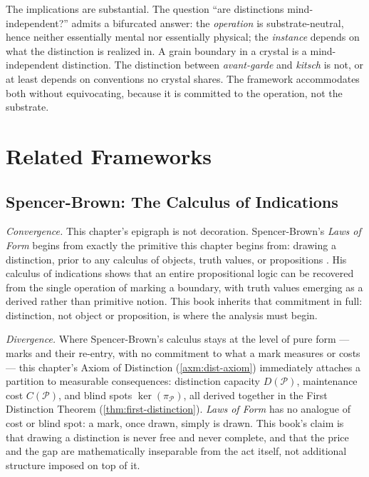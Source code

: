 \documentclass[12pt,twoside,openright]{book}
\newcommand{\partition}{\mathcal{P}}
\begin{document}
The implications are substantial. The question ``are
distinctions mind-independent?'' admits a bifurcated answer:
the \emph{operation} is substrate-neutral, hence neither
essentially mental nor essentially physical; the
\emph{instance} depends on what the distinction is realized
in. A grain boundary in a crystal is a mind-independent
distinction. The distinction between \emph{avant-garde} and
\emph{kitsch} is not, or at least depends on conventions no
crystal shares. The framework accommodates both without
equivocating, because it is committed to the operation, not
the substrate.

\section{Related Frameworks}
\label{sec:ch1-related-frameworks}

\subsection*{Spencer-Brown: The Calculus of Indications}

\emph{Convergence.} This chapter's epigraph is not decoration.
Spencer-Brown's \emph{Laws of Form} begins from exactly the
primitive this chapter begins from: drawing a distinction,
prior to any calculus of objects, truth values, or
propositions \parencite{spencer-brown1969}. His calculus of
indications shows that an entire propositional logic can be
recovered from the single operation of marking a boundary,
with truth values emerging as a derived rather than primitive
notion. This book inherits that commitment in full: distinction,
not object or proposition, is where the analysis must begin.

\emph{Divergence.} Where Spencer-Brown's calculus stays at the
level of pure form --- marks and their re-entry, with no
commitment to what a mark measures or costs --- this chapter's
Axiom of Distinction (\cref{axm:dist-axiom}) immediately
attaches a partition to measurable consequences: distinction
capacity $D(\partition)$, maintenance cost $C(\partition)$, and
blind spots $\ker(\pi_\partition)$, all derived together in the
First Distinction Theorem (\cref{thm:first-distinction}).
\emph{Laws of Form} has no analogue of cost or blind spot: a
mark, once drawn, simply is drawn. This book's claim is that
drawing a distinction is never free and never complete, and
that the price and the gap are mathematically inseparable from
the act itself, not additional structure imposed on top of it.
\end{document}
